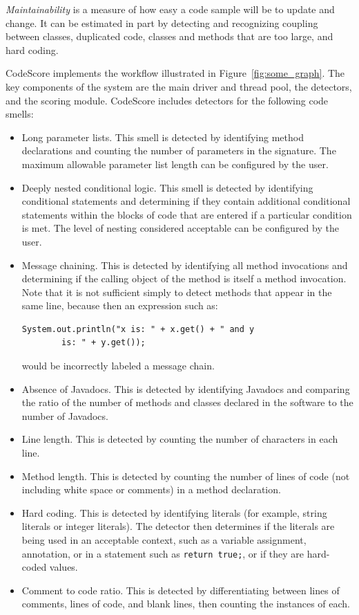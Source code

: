 \documentclass{sig-alternate}
\begin{document}
\emph{Maintainability} is a measure of how easy a code sample will be to update
and change. It can be estimated in part by detecting and recognizing coupling
between classes, duplicated code, classes and methods that are too large, and
hard coding. 

CodeScore implements the workflow illustrated in Figure~\ref{fig:some_graph}. The
key components of the system are the main driver and thread pool, the detectors,
and the scoring module. CodeScore includes detectors for the following code smells: 
\begin{itemize}
	\item Long parameter lists. This smell is detected by identifying method
		declarations and counting the number of parameters in the signature. The
		maximum allowable parameter list length can be configured by the user.
	\item Deeply nested conditional logic. This smell is detected by identifying
		conditional statements and determining if they contain additional conditional
		statements within the blocks of code that are entered if a particular
		condition is met. The level of nesting considered acceptable can be
		configured by the user.
	\item Message chaining. This is detected by identifying all method
		invocations and determining if the calling object of the method is
		itself a method invocation. Note that it is not sufficient
		simply to detect methods that appear in the same line, because then an
		expression such as: \begin{verbatim}System.out.println("x is: " + x.get() + " and y
		is: " + y.get());\end{verbatim} would be incorrectly labeled a message
		chain.
	\item Absence of Javadocs. This is detected by identifying Javadocs and
		comparing the ratio of the number of methods and classes declared in the software 
		to the number of Javadocs. 
	\item Line length. This is detected by counting the number of characters in
		each line.
	\item Method length. This is detected by counting the number of lines of
		code (not including white space or comments) in a method declaration.
	\item Hard coding. This is detected by identifying literals (for example, string
		literals or integer literals). The detector then determines if the
		literals are being used in an acceptable context, such as a variable assignment, 
		annotation, or in a statement such as \texttt{return true;}, or if
		they are hard-coded values.
	\item Comment to code ratio. This is detected by differentiating between
		lines of comments, lines of code, and blank lines, then counting the instances of each.
\end{itemize}
\end{document}
